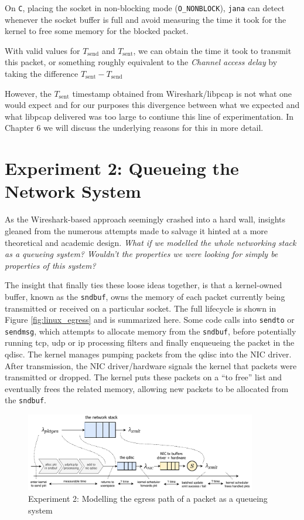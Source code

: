 On \texttt{C}, placing the socket in non-blocking mode (\texttt{O\_NONBLOCK}),
\texttt{jana} can detect whenever the socket buffer is full and avoid
measuring the time it took for the kernel to free some memory for the blocked
packet.

With valid values for $T_\text{send}$ and $T_\text{sent}$, we can obtain the
time it took to transmit this packet, or something roughly equivalent to the
\emph{Channel access delay} by taking the difference $T_\text{sent} -
T_\text{send}$

However, the $T_\text{sent}$ timestamp obtained from Wireshark/libpcap is not
what one would expect and for our purposes this divergence between what we
expected and what libpcap delivered was too large to contiune this line of
experimentation. In Chapter 6 we will discuss the underlying reasons for this
in more detail.

\section{Experiment 2: Queueing the Network System} \label{sec:experiment2}

As the Wireshark-based approach seemingly crashed into a hard wall, insights
gleaned from the numerous attempts made to salvage it hinted at a more
theoretical and academic design. \emph{What if we modelled the whole
networking stack as a queueing system? Wouldn't the properties we were looking
for simply be properties of this system?}

The insight that finally ties these loose ideas together, is that a
kernel-owned buffer, known as the \texttt{sndbuf}, owns the memory of each
packet currently being transmitted or received on a particular socket. The
full lifecycle is shown in Figure \ref{fig:linux_egress} and is summarized
here. Some code calls into \texttt{sendto} or \texttt{sendmsg}, which attempts
to allocate memory from the \texttt{sndbuf}, before potentially running tcp,
udp or ip processing filters and finally enqueueing the packet in the qdisc.
The kernel manages pumping packets from the qdisc into the NIC driver. After
transmission, the NIC driver/hardware signals the kernel that packets were
transmitted or dropped. The kernel puts these packets on a ``to free'' list
and eventually frees the related memory, allowing new packets to be allocated
from the \texttt{sndbuf}.


\begin{figure}
\center
\includegraphics[width=0.9\textwidth]{images/the-network-queue.pdf}
\caption{Experiment 2: Modelling the egress path of a packet as a queueing system}
\label{fig:exp2_overview}
\end{figure}


